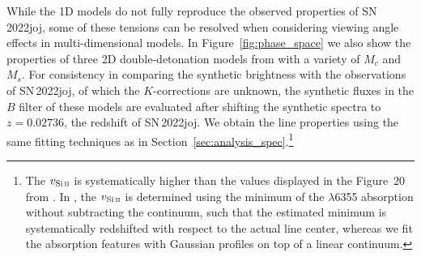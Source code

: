 \documentclass[twocolumn]{aastex631}
\newcommand{\sn}{SN\,2022joj}
\begin{document}
\begin{CJK*}{UTF8}{gbsn}
While the 1D models do not fully reproduce the observed properties of \sn, some of these tensions can be resolved when considering viewing angle effects in multi-dimensional models. In Figure~\ref{fig:phase_space} we also show the properties of three 2D double-detonation models from \citet{Shen_2D_2021} with a variety of $M_c$ and $M_s$. For consistency in comparing the synthetic brightness with the observations of \sn, of which the $K$-corrections are unknown, the synthetic fluxes in the $B$ filter of these models are evaluated after shifting the synthetic spectra to $z=0.02736$, the redshift of \sn. We obtain the  line properties using the same fitting techniques as in Section~\ref{sec:analysis_spec}.\footnote{The $v_\mathrm{Si\,\textsc{ii}}$ is systematically higher than the values displayed in the Figure~20 from \citet{Shen_2D_2021}. In \citet{Shen_2D_2021}, the $v_\mathrm{Si\,\textsc{ii}}$ is determined using the minimum of the  $\lambda$6355 absorption without subtracting the continuum, such that the estimated minimum is systematically redshifted with respect to the actual line center, whereas we fit the absorption features with Gaussian profiles on top of a linear continuum.}  

\end{CJK*}
\end{document}
